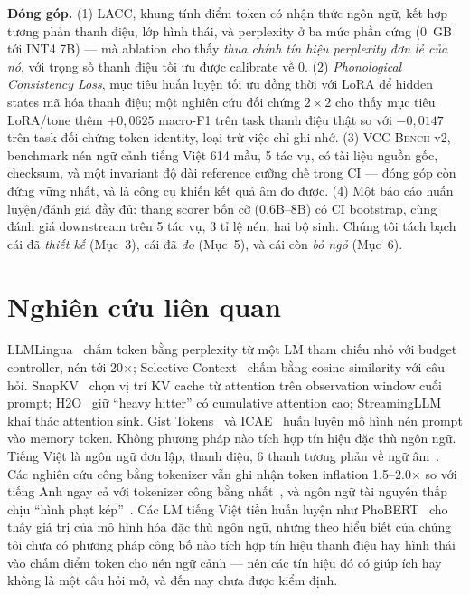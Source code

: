 \documentclass[runningheads]{llncs}
\newcommand{\method}[1]{\textsc{#1}}
\begin{document}
\textbf{Đóng góp.} (1) \method{LACC}, khung tính điểm token có nhận thức ngôn ngữ, kết hợp tương phản thanh điệu, lớp hình thái, và perplexity ở ba mức phần cứng (0~GB tới INT4 7B) --- mà ablation cho thấy \emph{thua chính tín hiệu perplexity đơn lẻ của nó}, với trọng số thanh điệu tối ưu được calibrate về 0. (2) \emph{Phonological Consistency Loss}, mục tiêu huấn luyện tối ưu đồng thời với LoRA để hidden states mã hóa thanh điệu; một nghiên cứu đối chứng $2{\times}2$ cho thấy mục tiêu LoRA/tone thêm $+0{,}0625$ macro-F1 trên task thanh điệu thật so với $-0{,}0147$ trên task đối chứng token-identity, loại trừ việc chỉ ghi nhớ. (3) \method{VCC-Bench} v2, benchmark nén ngữ cảnh tiếng Việt 614 mẫu, 5 tác vụ, có tài liệu nguồn gốc, checksum, và một invariant độ dài reference cưỡng chế trong CI --- đóng góp còn đứng vững nhất, và là công cụ khiến kết quả âm đo được. (4) Một báo cáo huấn luyện/đánh giá đầy đủ: thang scorer bốn cỡ (0.6B--8B) có CI bootstrap, cùng đánh giá downstream trên 5 tác vụ, 3 tỉ lệ nén, hai bộ sinh. Chúng tôi tách bạch cái đã \emph{thiết kế} (Mục~3), cái đã \emph{đo} (Mục~5), và cái còn \emph{bỏ ngỏ} (Mục~6).


\section{Nghiên cứu liên quan}

LLMLingua~\cite{jiang2023llmlingua} chấm token bằng perplexity từ một LM tham chiếu nhỏ với budget controller, nén tới 20$\times$; Selective Context~\cite{li2023selective} chấm bằng cosine similarity với câu hỏi. SnapKV~\cite{li2024snapkv} chọn vị trí KV cache từ attention trên observation window cuối prompt; H2O~\cite{zhang2023h2o} giữ ``heavy hitter'' có cumulative attention cao; StreamingLLM~\cite{xiao2024streamingllm} khai thác attention sink. Gist Tokens~\cite{mu2023gist} và ICAE~\cite{ge2024icae} huấn luyện mô hình nén prompt vào memory token. Không phương pháp nào tích hợp tín hiệu đặc thù ngôn ngữ. Tiếng Việt là ngôn ngữ đơn lập, thanh điệu, 6 thanh tương phản về ngữ âm~\cite{nguyen1997vietnamese}. Các nghiên cứu công bằng tokenizer vẫn ghi nhận token inflation 1.5--2.0$\times$ so với tiếng Anh ngay cả với tokenizer công bằng nhất~\cite{lee2026equity}, và ngôn ngữ tài nguyên thấp chịu ``hình phạt kép''~\cite{deng2026language}. Các LM tiếng Việt tiền huấn luyện như PhoBERT~\cite{nguyen2020phobert} cho thấy giá trị của mô hình hóa đặc thù ngôn ngữ, nhưng theo hiểu biết của chúng tôi chưa có phương pháp công bố nào tích hợp tín hiệu thanh điệu hay hình thái vào chấm điểm token cho nén ngữ cảnh --- nên các tín hiệu đó có giúp ích hay không là một câu hỏi mở, và đến nay chưa được kiểm định.
\end{document}
